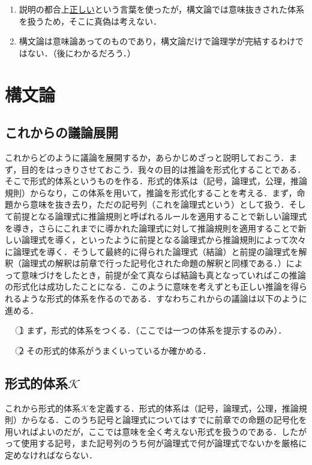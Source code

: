 \documentclass[10pt,b5paper,papersize,dvipdfmx]{jsbook}
\newcommand\maru[1]{\textcircled{\scriptsize{}#1}}
\newenvironment{TEIRI}[1]{
  \itemize
  \item [\headfont #1]
}{\enditemize}
\begin{document}
\begin{TEIRI}{※注意}
  \begin{enumerate}
    \item 説明の都合上\underline{正しい}という言葉を使ったが，構文論では意味抜きされた体系を扱うため，そこに真偽は考えない．
    \item 構文論は意味論あってのものであり，構文論だけで論理学が完結するわけではない．（後にわかるだろう．）
  \end{enumerate}
\end{TEIRI}

\section{構文論}
\subsection{これからの議論展開}
これからどのように議論を展開するか，あらかじめざっと説明しておこう．まず，目的をはっきりさせておこう．我々の目的は推論を形式化することである．そこで形式的体系というものを作る．形式的体系は（記号，論理式，公理，推論規則）からなり，この体系を用いて，推論を形式化することを考える．まず，命題から意味を抜き去り，ただの記号列（これを論理式という）として扱う．そして前提となる論理式に推論規則と呼ばれるルールを適用することで新しい論理式を導き，さらにこれまでに導かれた論理式に対して推論規則を適用することで新しい論理式を導く，といったように前提となる論理式から推論規則によって次々に論理式を導く．そうして最終的に得られた論理式（結論）と前提の論理式を解釈（論理式の解釈は前章で行った記号化された命題の解釈と同様である．）によって意味づけをしたとき，前提が全て真ならば結論も真となっていればこの推論の形式化は成功したことになる．このように意味を考えずとも正しい推論を得られるような形式的体系を作るのである．すなわちこれからの議論は以下のように進める．
\begin{itemize}
  \item[\maru{1}]まず，形式的体系をつくる．（ここでは一つの体系を提示するのみ）．
  \item[\maru{2}]その形式的体系がうまくいっているか確かめる．
\end{itemize}

\subsection{形式的体系\texorpdfstring{$\mathcal K$}{K}} %
これから形式的体系$\mathcal K$を定義する．形式的体系は（記号，論理式，公理，推論規則）からなる．このうち記号と論理式についてはすでに前章での命題の記号化を用いればよいのだが，ここでは意味を全く考えない形式を扱うのである．したがって使用する記号，また記号列のうち何が論理式で何が論理式でないかを厳格に定めなければならない．
\end{document}
